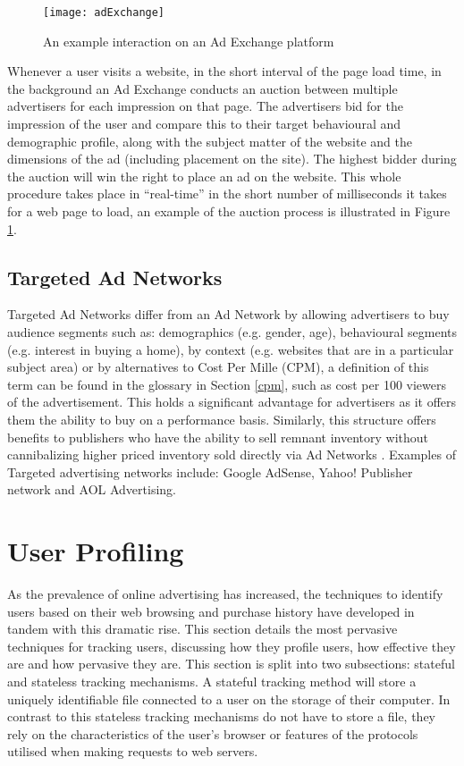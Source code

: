 \documentclass[12pt]{article}
\begin{document}
\begin{figure}[H]
    \centering
    \texttt{[image: adExchange]}
    \caption{An example interaction on an Ad Exchange platform \parencite{adExchanges}}
    \label{fig:adExchange}
\end{figure}

Whenever a user visits a website, in the short interval of the page load time, in the background an Ad Exchange conducts an auction between multiple advertisers for each impression on that page. The advertisers bid for the impression of the user and compare this to their target behavioural and demographic profile, along with the subject matter of the website and the dimensions of the ad (including placement on the site). The highest bidder during the auction will win the right to place an ad on the website. This whole procedure takes place in ``real-time'' in the short number of milliseconds it takes for a web page to load, an example of the auction process is illustrated in Figure \ref{fig:adExchange}. 

\subsection{ Targeted Ad Networks}
Targeted Ad Networks differ from an Ad Network by allowing advertisers to buy audience segments such as: demographics (e.g. gender, age),  behavioural segments (e.g. interest in buying a home), by context (e.g. websites that are in a particular subject area) or by alternatives to Cost Per Mille (CPM), a definition of this term can be found in the glossary in Section \ref{cpm}, such as cost per 100 viewers of the advertisement. This holds a significant advantage for advertisers as it offers them the ability to buy on a performance basis. Similarly, this structure offers benefits to publishers who have the ability to sell remnant inventory without cannibalizing higher priced inventory sold directly via Ad Networks \parencite{adExchanges}. Examples of Targeted advertising networks include: Google AdSense, Yahoo! Publisher network and AOL Advertising.

\pagebreak

\section{User Profiling}
As the prevalence of online advertising has increased, the techniques to identify users based on their web browsing and purchase history have developed in tandem with this dramatic rise. This section details the most pervasive techniques for tracking users, discussing how they profile users, how effective they are and how pervasive they are. This section is split into two subsections: stateful and stateless tracking mechanisms. A stateful tracking method will store a uniquely identifiable file connected to a user on the storage of their computer. In contrast to this stateless tracking mechanisms do not have to store a file, they rely on the characteristics of the user's browser or features of the protocols utilised when making requests to web servers.
\end{document}
